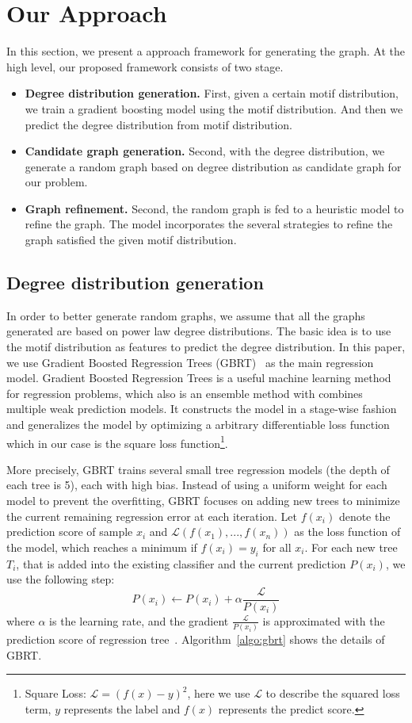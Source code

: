 \section{Our Approach}
\label{sec:approach}

In this section, we present a approach framework for generating the graph. At the high level, our proposed framework consists of two stage.
\begin{itemize}
    \item {\bf Degree distribution generation.} First, given a certain motif distribution, we train a gradient boosting model using the motif distribution. And then we predict the degree distribution from motif distribution.
    \item {\bf Candidate graph generation.} Second, with the degree distribution, we generate a random graph based on degree distribution as candidate graph for our problem.
    \item {\bf Graph refinement.} Second, the random graph is fed to a heuristic model to refine the graph. The model incorporates the several strategies to refine the graph satisfied the given motif distribution.
\end{itemize}

\subsection{Degree distribution generation} 

In order to better generate random graphs, we assume that all the graphs generated are based on power law degree distributions. The basic idea is to use the motif distribution as features to predict the degree distribution. In this paper, we use Gradient Boosted Regression Trees (GBRT)~\cite{friedman2002stochastic} as the main regression model. Gradient Boosted Regression Trees is a useful machine learning method for regression problems, which also is an ensemble method with combines multiple weak prediction models. It constructs the model in a stage-wise fashion and generalizes the model by optimizing a arbitrary differentiable loss function which in our case is the square loss function\footnote{Square Loss: $\mathcal{L} = (f(x) - y)^2$, here we use $\mathcal{L}$ to describe the squared loss term, $y$ represents the label and $f(x)$ represents the predict score.}. 

More precisely, GBRT trains several small tree regression models (the depth of each tree is 5), each with high bias. Instead of using a uniform weight for each model to prevent the overfitting, GBRT focuses on adding new trees to minimize the current remaining regression error at each iteration. Let $f(x_i)$ denote the prediction score of sample $x_i$ and $\mathcal{L}(f(x_1),...,f(x_n))$ as the loss function of the model, which reaches a minimum if $f(x_i) = y_i$ for all $x_i$. For each new tree $T_i$, that is added into the existing classifier and the current prediction $P(x_i)$, we use the following step:
$$P(x_i) \leftarrow P(x_i) + \alpha \frac{\mathcal{L}}{P(x_i)}$$
\noindent where $\alpha$ is the learning rate, and the gradient $\frac{\mathcal{L}}{P(x_i)}$ is approximated with the prediction score of regression tree~\cite{zheng2007general}. Algorithm~\ref{algo:gbrt} shows the details of GBRT.

